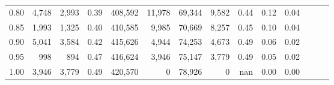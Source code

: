 \begin{tabular}{rrrrrrrrrrrrrr}
0.80 &   4,748 &   2,993 &  0.39 &  408,592 &   11,978 &  69,344 &   9,582 &  0.44 &  0.12 &      0.04 \\
0.85 &   1,993 &   1,325 &  0.40 &  410,585 &    9,985 &  70,669 &   8,257 &  0.45 &  0.10 &      0.04 \\
0.90 &   5,041 &   3,584 &  0.42 &  415,626 &    4,944 &  74,253 &   4,673 &  0.49 &  0.06 &      0.02 \\
0.95 &     998 &     894 &  0.47 &  416,624 &    3,946 &  75,147 &   3,779 &  0.49 &  0.05 &      0.02 \\
1.00 &   3,946 &   3,779 &  0.49 &  420,570 &        0 &  78,926 &       0 &   nan &  0.00 &      0.00 \\
\bottomrule
\end{tabular}
